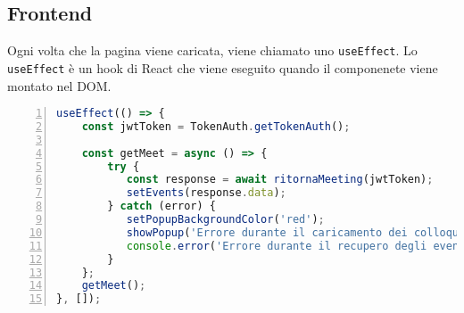 \subsection{Frontend}
Ogni volta che la pagina viene caricata, viene chiamato uno \texttt{useEffect}.
Lo \texttt{useEffect} è un hook di React che viene eseguito quando il componenete viene montato nel DOM. \cite{reactUseEffect}
\begin{lstlisting}[language=typescript, frame=lines, basicstyle=\ttfamily\scriptsize, numbers=left]
useEffect(() => {
    const jwtToken = TokenAuth.getTokenAuth();
    
    const getMeet = async () => {
        try {
           const response = await ritornaMeeting(jwtToken);
           setEvents(response.data);
        } catch (error) {
           setPopupBackgroundColor('red');
           showPopup('Errore durante il caricamento dei colloqui');
           console.error('Errore durante il recupero degli eventi:', error);
        }
    };  
    getMeet();
}, []);
\end{lstlisting}
